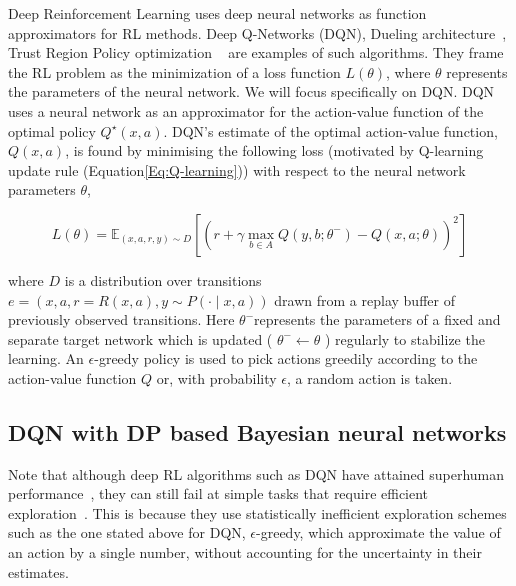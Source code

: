 \documentclass[10pt]{article}
\begin{document}
Deep Reinforcement Learning uses deep neural networks as function approximators for RL methods. Deep Q-Networks (DQN)\citep{mnih2015human}, Dueling architecture~\citep{wang2016dueling}, Trust Region Policy optimization ~\citep{schulman2015trust} are examples of such algorithms. They frame the RL problem as the minimization of a loss function $L(\theta)$, where $\theta$ represents the parameters of the neural network. We will focus specifically on DQN.
DQN ~\citep{mnih2015human} uses a neural network as an approximator for the action-value function of the optimal policy $Q^{\star}(x, a)$. DQN's estimate of the optimal action-value function, $Q(x, a)$, is found by minimising the following loss (motivated by Q-learning update rule (Equation\ref{Eq:Q-learning})) with respect to the neural network parameters $\theta$,

\begin{equation}\label{eq:DQN-loss}
L(\theta)=\mathbb{E}_{(x, a, r, y) \sim D}\left[\left(r+\gamma \max _{b \in A} Q\left(y, b ; \theta^{-}\right)-Q(x, a ; \theta)\right)^{2}\right]
\end{equation}

where $D$ is a distribution over transitions $e=(x, a, r=R(x, a), y \sim P(\cdot \mid x, a))$ drawn from a replay buffer of previously observed transitions. Here $\theta^{-}$represents the parameters of a fixed and separate target network which is updated ( $\theta^{-} \leftarrow \theta$ ) regularly to stabilize the learning. An $\epsilon$-greedy policy is used to pick actions greedily according to the action-value function $Q$ or, with probability $\epsilon$, a random action is taken.

\subsection{DQN with DP based Bayesian neural networks}

Note that although deep RL algorithms such as DQN have attained superhuman performance~\citep{mnih2015human}, they can still fail at simple tasks that require efficient exploration~\citep{osband2016deep}. This is because they use statistically inefficient exploration schemes such as the one stated above for DQN, $\epsilon$-greedy, which approximate the value of an action by a single number, without accounting for the uncertainty in their estimates.  
\end{document}

